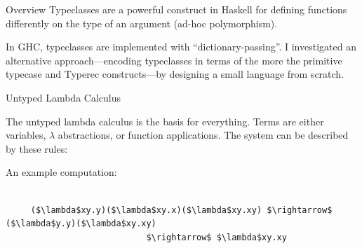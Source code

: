 \documentclass[portrait,final,paperwidth=40in,paperheight=40in]{baposter}
\begin{document}
{\begin{poster}
  \begin{posterbox}[name=overview,row=0,column=0]{Overview}
   Typeclasses are a powerful construct in Haskell for defining functions
   differently on the type of an argument (ad-hoc polymorphism).
   
   In GHC, typeclasses are implemented with ``dictionary-passing''.
   I investigated an alternative approach---encoding typeclasses in terms of the
   more the primitive typecase and Typerec constructs---by designing a small
   language from scratch. 
  \vspace{0.3em}

 \end{posterbox}

  \begin{posterbox}[name=untyped,below=overview]{Untyped Lambda Calculus}
 
  The untyped lambda calculus is the basis for everything. Terms are either
  variables, $\lambda$ abstractions, or function applications.
  The system can be described by these rules:

  \begin{prooftree}
  \end{prooftree}

  \begin{prooftree}
  \end{prooftree}

  \begin{prooftree}
  \end{prooftree}   

  An example computation:

  \begin{lstlisting}[mathescape]

     ($\lambda$xy.y)($\lambda$xy.x)($\lambda$xy.xy) $\rightarrow$ ($\lambda$y.y)($\lambda$xy.xy)
                            $\rightarrow$ $\lambda$xy.xy

  \end{lstlisting}


\end{posterbox}
\end{poster}}
\end{document}
